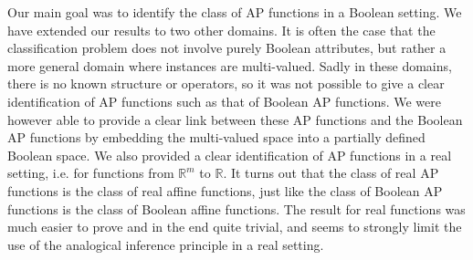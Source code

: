 Our main goal was to identify the class of AP functions in a Boolean setting.
We have extended our results to two other domains. It is often the case that
the classification problem does not involve purely Boolean attributes, but
rather a more general domain where instances are multi-valued. Sadly in these
domains, there is no known structure or operators, so it was not possible to
give a clear identification of AP functions such as that of Boolean AP
functions. We were however able to provide a clear link between these AP
functions and the Boolean AP functions by embedding the multi-valued space
into a partially defined Boolean space. We also provided a clear identification
of AP functions in a real setting, i.e. for functions from $\mathbb{R}^m$ to
$\mathbb{R}$. It turns out that the class of real AP functions is the class of
real affine functions, just like the class of Boolean AP functions is the class
of Boolean affine functions. The result for real functions was much easier to
prove and in the end quite trivial, and seems to strongly limit the use of the
analogical inference principle in a real setting.
